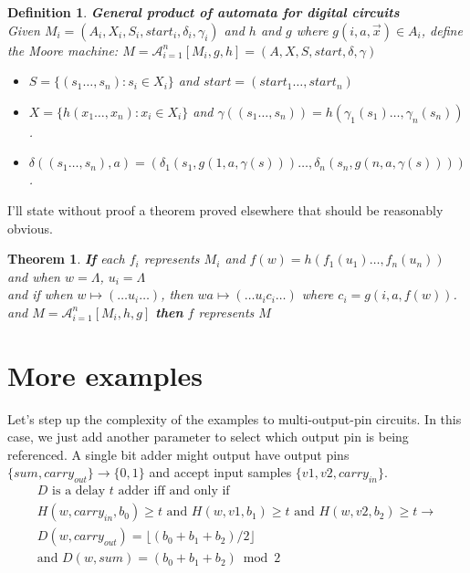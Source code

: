 \documentclass[runningheads,letter]{llncs}
\newcommand{\set}[1]{\{#1\}}
\newcommand{\ess}{\Lambda}
\newcommand{\Aprod}{\mathcal{A}}
\newcommand{\st}{\mathit{start}}
\newtheorem{thm}{Theorem}
\newtheorem{dfn}{Definition}[section]
\begin{document}
\begin{dfn}{\rm
\textbf{General product of automata for digital circuits}\\
Given $M_i=(A_i,X_i,S_i,\st_i,\delta_i,\gamma_i)$ and $h$ and 
$g$ where $g(i,a,\vec{x})\in A_i$, define the Moore machine:
$M = \Aprod_{i=1}^n [ M_i, g,h] = (A,X,S,\st, \delta,\gamma)$\\
\begin{itemize}
\item $S = \set{(s_1 \ldots,s_n): s_i\in X_i}$ and $\st = (\st_1 \ldots ,\st_n)$
\item $X=\set{h(x_1 \ldots  ,x_n): x_i\in X_i}$ and $\gamma((s_1 \ldots , s_n))= h(\gamma_1(s_1)\ldots ,\gamma_n(s_n) )$.
\item $\delta((s_1 \ldots , s_n),a) = (\delta_1(s_1,g(1,a,\gamma(s))) \ldots , \delta_n(s_n,g(n,a,\gamma(s))))$.
\end{itemize} }
\end{dfn}

I'll state without proof a theorem proved elsewhere that should be reasonably
obvious\cite{yodaikenprpresent}.
\begin{thm}\label{thm:main}{\rm
\textbf{If} each $f_i$ represents $M_i$
and $f(w) = h(f_1(u_1)\dots,f_n(u_n))$\\
and when $w=\ess$, $u_i=\ess$\\
and if when $w\mapsto (\dots u_i \dots)$, then $wa\mapsto (\dots u_ic_i \dots)$ where $c_i = g(i,a,f(w))$.\\
and $M= \Aprod_{i=1}^n [M_i, h,g]$
\textbf{then} $f$ represents $M$
}\end{thm}

\section{More examples\label{sec:example2}}

Let's step up the complexity of the examples to  multi-output-pin circuits.
In this case, we just add another parameter to select which output pin is
being referenced.
A single bit adder might output have output pins
$\set{sum,carry_{out}}\to \set{0,1}$ and accept
input samples $\set{v1,v2,carry_{in}}$. 
\begin{eqnarray}
D \mbox{ is a delay }t\mbox{ adder iff and only if }\nonumber\\
H(w,carry_{in},b_0)\geq t\mbox{ and }H(w,v1,b_1)\geq t\mbox{ and }H(w,v2,b_2)\geq t\rightarrow\nonumber\\
D(w,carry_{out})= \lfloor(b_0+b_1+b_2)/2\rfloor\\
\mbox{and }
D(w,sum)= (b_0+b_1+b_2)\bmod 2 \nonumber
\end{eqnarray}
\end{document}
